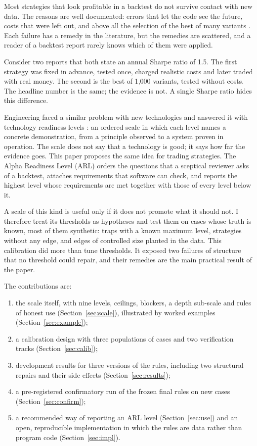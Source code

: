 \documentclass[11pt]{article}
\begin{document}
Most strategies that look profitable in a backtest do not survive contact with new data. The reasons are well
documented: errors that let the code see the future, costs that were left out, and above all the selection of the best
of many variants \citep{bailey2014deflated,harvey2016cross,arnott2019backtesting}. Each failure has a remedy in the
literature, but the remedies are scattered, and a reader of a backtest report rarely knows which of them were applied.

Consider two reports that both state an annual Sharpe ratio of 1.5. The first strategy was fixed in advance, tested
once, charged realistic costs and later traded with real money. The second is the best of 1,000 variants, tested
without costs. The headline number is the same; the evidence is not. A single Sharpe ratio hides this difference.

Engineering faced a similar problem with new technologies and answered it with technology readiness levels
\citep{mankins1995trl}: an ordered scale in which each level names a concrete demonstration, from a principle observed
to a system proven in operation. The scale does not say that a technology is good; it says how far the evidence goes.
This paper proposes the same idea for trading strategies. The Alpha Readiness Level (ARL) orders the questions that a
sceptical reviewer asks of a backtest, attaches requirements that software can check, and reports the highest level
whose requirements are met together with those of every level below it.

A scale of this kind is useful only if it does not promote what it should not. I therefore treat its thresholds as
hypotheses and test them on cases whose truth is known, most of them synthetic: traps with a known maximum level,
strategies without any edge, and edges of controlled size planted in the data. This calibration did more than tune
thresholds. It exposed two failures of structure that no threshold could repair, and their remedies are the main
practical result of the paper.

The contributions are:
\begin{enumerate}
\item the scale itself, with nine levels, ceilings, blockers, a depth sub-scale and rules of honest use
(Section~\ref{sec:scale}), illustrated by worked examples (Section~\ref{sec:example});
\item a calibration design with three populations of cases and two verification tracks (Section~\ref{sec:calib});
\item development results for three versions of the rules, including two structural repairs and their side effects
(Section~\ref{sec:results});
\item a pre-registered confirmatory run of the frozen final rules on new cases (Section~\ref{sec:confirm});
\item a recommended way of reporting an ARL level (Section~\ref{sec:use}) and an open, reproducible implementation in
which the rules are data rather than program code (Section~\ref{sec:impl}).
\end{enumerate}
\end{document}
